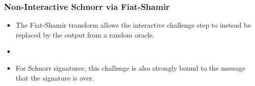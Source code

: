 \documentclass[hyperref={pdfpagelabels=true},table,dvipsnames,14pt,aspectratio=169]{beamer}
\begin{document}
\begin{frame}
  \centering
\scalebox{0.9} {
}
\end{frame}

\begin{frame}
  \frametitle{Non-Interactive Schnorr via Fiat-Shamir}

  \begin{itemize}
    \item<1-> The Fiat-Shamir transform allows the interactive challenge step to instead be replaced by the output from a random oracle. 
    \item[]
    \item<2-> For Schnorr signatures, this challenge is also strongly bound to the message that the signature is over. 
  \end{itemize}
\end{frame}
\end{document}
